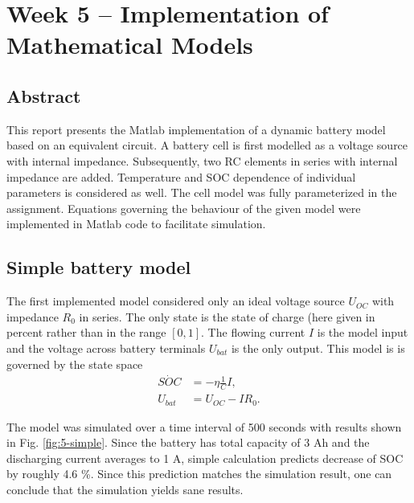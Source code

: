 
\chapter{Week 5 -- Implementation of Mathematical Models}

\section{Abstract}
This report presents the Matlab implementation of a dynamic battery model based on an equivalent circuit. A battery cell is first modelled as a voltage source with internal impedance. Subsequently, two RC elements in series with internal impedance are added. Temperature and SOC dependence of individual parameters is considered as well. The cell model was fully parameterized in the assignment. Equations governing the behaviour of the given model were implemented in Matlab code to facilitate simulation.


\section{Simple battery model}

The first implemented model considered only an ideal voltage source $U_{OC}$ with impedance $R_0$ in series. The only state is the state of charge (here given in percent rather than in the range $\left[0, 1\right]$. The flowing current $I$ is the model input and the voltage across battery terminals $U_{bat}$ is the only output. This model is is governed by the state space
\begin{equation}
\begin{split}
    \dot{SOC} &= -\eta \frac{1}{C} I, \\
    U_{bat} &= U_{OC} - I R_0.
\end{split}
\label{eq:5-simple}
\end{equation}

The model was simulated over a time interval of 500 seconds with results shown in Fig. \ref{fig:5-simple}. Since the battery has total capacity of 3 Ah and the discharging current averages to 1 A, simple calculation predicts decrease of SOC by roughly 4.6 \%. Since this prediction matches the simulation result, one can conclude that the simulation yields sane results.



